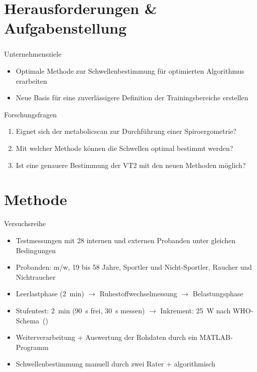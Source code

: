 \documentclass[colorBG,slideColor,8pt]{beamer}
\let\oldframetitle\frametitle%
\renewcommand{\frametitle}[1]{%
	\oldframetitle{#1}\setstretch{1.5}}
\begin{document}

\section{Herausforderungen \& Aufgabenstellung}

\begin{frame}
\frametitle{}
\begin{block}{Unternehmensziele}
	\begin{itemize}
		\item Optimale Methode zur Schwellenbestimmung für optimierten Algorithmus erarbeiten
		\item Neue Basis für eine zuverlässigere Definition der Trainingsbereiche erstellen
	\end{itemize}
\end{block}
\begin{block}{Forschungsfragen}
	\begin{enumerate}
		\item Eignet sich der metabolicscan zur Durchführung einer Spiroergometrie?
		\item Mit welcher Methode können die Schwellen optimal bestimmt werden?
		\item Ist eine genauere Bestimmung der VT2 mit den neuen Methoden möglich?
	\end{enumerate}
\end{block}
\end{frame}

\section{Methode}

\begin{frame}{Versuchsreihe}
\begin{itemize}
	\item Testmessungen mit 28 internen und externen Probanden unter gleichen Bedingungen
	\item Probanden: m/w, 19 bis 58 Jahre, Sportler und Nicht-Sportler, Raucher und Nichtraucher
	\item Leerlastphase (\SI{2}{\minute}) $\rightarrow$ Ruhestoffwechselmessung $\rightarrow$ Belastungsphase
	\item Stufentest: \SI{2}{\minute} (\SI{90}{\second} frei, \SI{30}{\second} messen) $\rightarrow$ Inkrement: \SI{25}{\watt} nach WHO-Schema~(\cite{Trappe.2000})
	\item Weiterverarbeitung + Auswertung der Rohdaten durch ein MATLAB-Programm
	\item Schwellenbestimmung manuell durch zwei Rater + algorithmisch
\end{itemize}
\end{frame}
\end{document}
